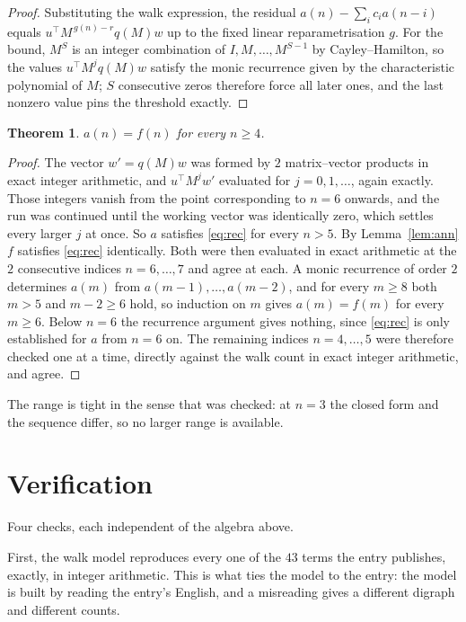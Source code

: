 \documentclass[11pt,a4paper]{article}
\theoremstyle{plain}
\newtheorem{theorem}{Theorem}
\theoremstyle{definition}
\begin{document}
\begin{proof}
Substituting the walk expression, the residual $a(n)-\sum_ic_ia(n-i)$ equals
$u^{\!\top}M^{\,g(n)-r}q(M)w$ up to the fixed linear reparametrisation $g$. For the bound,
$M^{S}$ is an integer combination of $I,M,\dots,M^{S-1}$ by Cayley--Hamilton, so the values
$u^{\!\top}M^{j}q(M)w$ satisfy the monic recurrence given by the characteristic polynomial of
$M$; $S$ consecutive zeros therefore force all later ones, and the last nonzero value pins the
threshold exactly.
\end{proof}

\begin{theorem}
$a(n)=f(n)$ for every $n\ge4$.
\end{theorem}

\begin{proof}
The vector $w'=q(M)w$ was formed by $2$ matrix--vector products in exact integer
arithmetic, and $u^{\!\top}M^{j}w'$ evaluated for $j=0,1,\dots$, again exactly. Those integers
vanish from the point corresponding to $n=6$ onwards, and the run was continued until the
working vector was identically zero, which settles every larger $j$ at once. So $a$ satisfies
\eqref{eq:rec} for every $n>5$. By Lemma~\ref{lem:ann} $f$ satisfies \eqref{eq:rec}
identically. Both were then evaluated in exact arithmetic at the $2$ consecutive indices
$n=6,\dots,7$ and agree at each. A monic recurrence of order $2$
determines $a(m)$ from $a(m-1),\dots,a(m-2)$, and for every $m\ge8$ both
$m>5$ and $m-2\ge6$ hold, so induction on $m$ gives $a(m)=f(m)$ for every
$m\ge6$.
Below $n=6$ the recurrence argument gives nothing, since \eqref{eq:rec} is only
established for $a$ from $n=6$ on. The remaining indices $n=4,\dots,5$ were
therefore checked one at a time, directly against the walk count in exact integer arithmetic,
and agree.
\end{proof}

The range is tight in the sense that was checked: at $n=3$ the closed form and the sequence differ, so no larger range is available.

\section{Verification}

Four checks, each independent of the algebra above.

First, the walk model reproduces every one of the $43$ terms the entry publishes,
exactly, in integer arithmetic. This is what ties the model to the entry: the model is built
by reading the entry's English, and a misreading gives a different digraph and different
counts.
\end{document}

